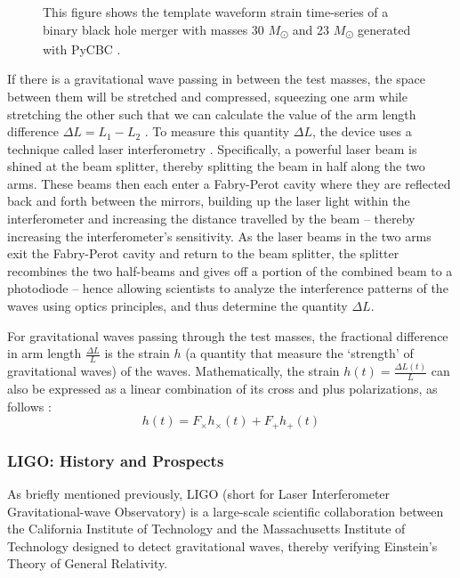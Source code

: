 \documentclass[preprint,
letterpaper,
 amsmath,amssymb,
 aps,
]{revtex4-2}
\begin{document}
\begin{figure}[!tbp]
\begin{minipage}[b]{0.48\textwidth}
    \caption{This figure shows the template waveform strain time-series of a binary black hole merger with masses 30 $M$\textsubscript{\(\odot\)} and 23 $M$\textsubscript{\(\odot\)} generated with PyCBC \cite{pycbc}.}
  \end{minipage}
\end{figure}
If there is a gravitational wave passing in between the test masses, the space between them will be stretched and compressed, squeezing one arm while stretching the other such that we can calculate the value of the arm length difference $\Delta L = L_1 - L_2$ \cite{teacherintro}. To measure this quantity $\Delta L$, the device uses a technique called laser interferometry \cite{LIGOArxiv}. Specifically, a powerful laser beam is shined at the beam splitter, thereby splitting the beam in half along the two arms. These beams then each enter a Fabry-Perot cavity where they are reflected back and forth between the mirrors, building up the laser light within the interferometer and increasing the distance travelled by the beam \cite{fabry} – thereby increasing the interferometer's sensitivity. As the laser beams in the two arms exit the Fabry-Perot cavity and return to the beam splitter, the splitter recombines the two half-beams and gives off a portion of the combined beam to a photodiode – hence allowing scientists to analyze the interference patterns of the waves using optics principles, and thus determine the quantity $\Delta L$. 

For gravitational waves passing through the test masses, the fractional difference in arm length $\frac{\Delta L}{L}$ is the strain $h$ (a quantity that measure the `strength' of gravitational waves) of the waves. Mathematically, the strain $h(t) = \frac{\Delta L(t)}{L}$ can also be expressed as a linear combination of its cross and plus polarizations, as follows \cite{JSTORLIGO}:
\begin{equation}
h(t) = F_\times h_\times (t) + F_+ h_+ (t)
\end{equation}
\subsubsection{LIGO: History and Prospects}

As briefly mentioned previously, LIGO (short for Laser Interferometer Gravitational-wave Observatory) is a large-scale scientific collaboration between the California Institute of Technology and the Massachusetts Institute of Technology designed to detect gravitational waves, thereby verifying Einstein's Theory of General Relativity. 
\end{document}
